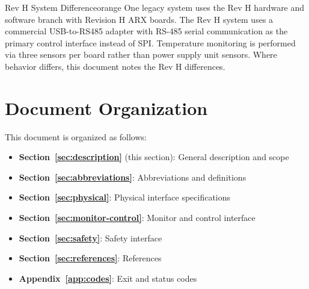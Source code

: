 \begin{calloutBox}{Rev H System Difference}{orange}
One legacy system uses the Rev H hardware and software branch with Revision H ARX boards. The Rev H system uses a commercial USB-to-RS485 adapter with RS-485 serial communication as the primary control interface instead of SPI. Temperature monitoring is performed via three sensors per board rather than power supply unit sensors. Where behavior differs, this document notes the Rev H differences.
\end{calloutBox}

\section{Document Organization}

This document is organized as follows:
\begin{itemize}
    \item \textbf{Section~\ref{sec:description}} (this section): General description and scope
    \item \textbf{Section~\ref{sec:abbreviations}}: Abbreviations and definitions
    \item \textbf{Section~\ref{sec:physical}}: Physical interface specifications
    \item \textbf{Section~\ref{sec:monitor-control}}: Monitor and control interface
    \item \textbf{Section~\ref{sec:safety}}: Safety interface
    \item \textbf{Section~\ref{sec:references}}: References
    \item \textbf{Appendix~\ref{app:codes}}: Exit and status codes
\end{itemize}
